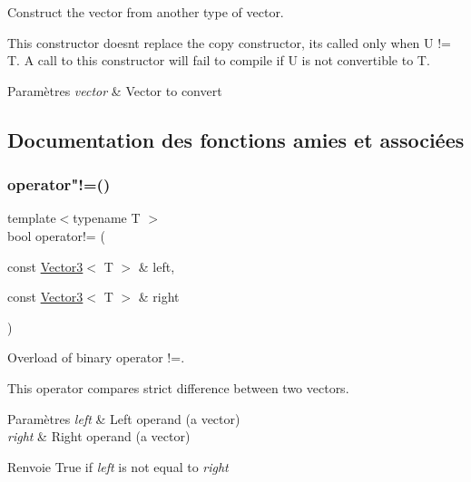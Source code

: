 Construct the vector from another type of vector. 

This constructor doesn\textquotesingle{}t replace the copy constructor, it\textquotesingle{}s called only when U != T. A call to this constructor will fail to compile if U is not convertible to T.


\begin{DoxyParams}{Paramètres}
{\em vector} & Vector to convert \\
\hline
\end{DoxyParams}


\subsection{Documentation des fonctions amies et associées}
\mbox{\label{classsf_1_1Vector3_a608500d1ad3b78082cb5bb4356742bd4}} 
\subsubsection{\texorpdfstring{operator"!=()}{operator!=()}}
{\footnotesize\ttfamily template$<$typename T $>$ \\
bool operator!= (\begin{DoxyParamCaption}\item[{const \hyperlink{classsf_1_1Vector3}{Vector3}$<$ T $>$ \&}]{left,  }\item[{const \hyperlink{classsf_1_1Vector3}{Vector3}$<$ T $>$ \&}]{right }\end{DoxyParamCaption})\hspace{0.3cm}{\ttfamily [related]}}



Overload of binary operator !=. 

This operator compares strict difference between two vectors.


\begin{DoxyParams}{Paramètres}
{\em left} & Left operand (a vector) \\
\hline
{\em right} & Right operand (a vector)\\
\hline
\end{DoxyParams}
\begin{DoxyReturn}{Renvoie}
True if {\itshape left} is not equal to {\itshape right} 
\end{DoxyReturn}
\mbox{\label{classsf_1_1Vector3_a44ec312b31c1a85dcff4863795f98329}} 
